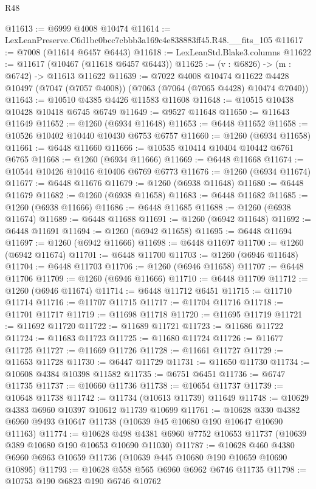 \begin{lexlean}{R48}
\begin{coremodule}
@11613 := @6999 @4008 @10474
@11614 := LexLeanPreserve.C6d1bc0bcc7cbbb3a169c4e838883ff45.R48.__fits_105
@11617 := @7008 (@11614 @6457 @6443)
@11618 := LexLeanStd.Blake3.columns
@11622 := @11617 (@10467 (@11618 @6457 @6443))
@11625 := (v : @6826) -> (m : @6742) -> @11613 @11622
@11639 := @7022
    @4008
    @10474
    @11622
    @4428
    @10497
    (@7047 (@7057 @4008))
    (@7063 (@7064 (@7065 @4428) @10474 @7040))
@11643 := @10510 @4385 @4426 @11583 @11608
@11648 := @10515 @10438 @10428 @10418 @6745 @6749
@11649 := @9527 @11648
@11650 := @11643 @11649
@11652 := @1260 (@6934 @11648)
@11653 := @6448 @11652
@11658 := @10526 @10402 @10440 @10430 @6753 @6757
@11660 := @1260 (@6934 @11658)
@11661 := @6448 @11660
@11666 := @10535 @10414 @10404 @10442 @6761 @6765
@11668 := @1260 (@6934 @11666)
@11669 := @6448 @11668
@11674 := @10544 @10426 @10416 @10406 @6769 @6773
@11676 := @1260 (@6934 @11674)
@11677 := @6448 @11676
@11679 := @1260 (@6938 @11648)
@11680 := @6448 @11679
@11682 := @1260 (@6938 @11658)
@11683 := @6448 @11682
@11685 := @1260 (@6938 @11666)
@11686 := @6448 @11685
@11688 := @1260 (@6938 @11674)
@11689 := @6448 @11688
@11691 := @1260 (@6942 @11648)
@11692 := @6448 @11691
@11694 := @1260 (@6942 @11658)
@11695 := @6448 @11694
@11697 := @1260 (@6942 @11666)
@11698 := @6448 @11697
@11700 := @1260 (@6942 @11674)
@11701 := @6448 @11700
@11703 := @1260 (@6946 @11648)
@11704 := @6448 @11703
@11706 := @1260 (@6946 @11658)
@11707 := @6448 @11706
@11709 := @1260 (@6946 @11666)
@11710 := @6448 @11709
@11712 := @1260 (@6946 @11674)
@11714 := @6448 @11712 @6451
@11715 := @11710 @11714
@11716 := @11707 @11715
@11717 := @11704 @11716
@11718 := @11701 @11717
@11719 := @11698 @11718
@11720 := @11695 @11719
@11721 := @11692 @11720
@11722 := @11689 @11721
@11723 := @11686 @11722
@11724 := @11683 @11723
@11725 := @11680 @11724
@11726 := @11677 @11725
@11727 := @11669 @11726
@11728 := @11661 @11727
@11729 := @11653 @11728
@11730 := @6447 @11729
@11731 := @11650 @11730
@11734 := @10608 @4384 @10398 @11582
@11735 := @6751 @6451
@11736 := @6747 @11735
@11737 := @10660 @11736
@11738 := @10654 @11737
@11739 := @10648 @11738
@11742 := @11734 (@10613 @11739) @11649
@11748 := @10629 @4383 @6960 @10397 @10612 @11739 @10699
@11761 := @10628 @330 @4382 @6960 @9493 @10647 @11738 (@10639 @45 @10680 @190 @10647 @10690 @11163)
@11774 := @10628 @498 @4381 @6960 @7752 @10653 @11737 (@10639 @389 @10680 @190 @10653 @10690 @11030)
@11787 := @10628 @460 @4380 @6960 @6963 @10659 @11736 (@10639 @445 @10680 @190 @10659 @10690 @10895)
@11793 := @10628 @558 @565 @6960 @6962 @6746 @11735
@11798 := @10753 @190 @6823 @190 @6746 @10762

\end{coremodule}
\end{lexlean}

